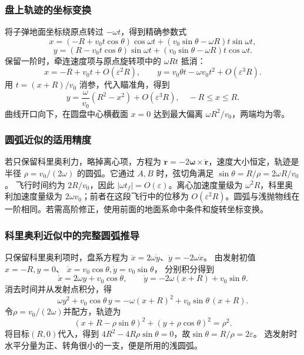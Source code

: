 \documentclass[UTF8,fontset=fandol,a4paper,11pt]{ctexart}
\newcommand{\vect}[1]{\bm{#1}}
\begin{document}
\subsubsection*{盘上轨迹的坐标变换}
将子弹地面坐标绕原点转过 $-\omega t$，得到精确参数式
\[
x=(-R+v_0t\cos\theta)\cos\omega t
+(v_0\sin\theta-\omega R)t\sin\omega t,
\]
\[
y=(R-v_0t\cos\theta)\sin\omega t
+(v_0\sin\theta-\omega R)t\cos\omega t.
\]
保留一阶时，牵连速度项与原点旋转项中的 $\omega Rt$ 抵消：
\[
x=-R+v_0t+O(\varepsilon^2R),\qquad
y=v_0\theta t-\omega v_0t^2+O(\varepsilon^3R).
\]
用 $t=(x+R)/v_0$ 消参，代入瞄准角，得到
\[
\boxed{y=\frac\omega{v_0}(R^2-x^2)+O(\varepsilon^3R),\quad -R\leq x\leq R}.
\]
曲线开口向下，在圆盘中心横截面 $x=0$ 达到最大偏离 $\omega R^2/v_0$，两端均为零。

\subsubsection*{圆弧近似的适用精度}
若只保留科里奥利力，略掉离心项，方程为 $\ddot{\vect r}=-2\vect\omega\times\dot{\vect r}$，速度大小恒定，轨迹是半径 $\rho=v_0/(2\omega)$ 的圆弧。它通过 $A,B$ 时，弦切角满足 $\sin\theta=R/\rho=2\omega R/v_0$。
飞行时间约为 $2R/v_0$，因此 $|\omega t_f|=O(\varepsilon)$。离心加速度量级为 $\omega^2 R$，科里奥利加速度量级为 $2\omega v_0$；前者在这段飞行中的位移为 $O(\varepsilon^2R)$。圆弧与浅抛物线在一阶相同。若需高阶修正，使用前面的地面系命中条件和旋转坐标变换。
\subsubsection*{科里奥利近似中的完整圆弧推导}
只保留科里奥利项时，盘系方程为
$\ddot x=2\omega\dot y$、$\ddot y=-2\omega\dot x$。
由发射初值$x=-R,y=0$、
$\dot x=v_0\cos\theta,\dot y=v_0\sin\theta$，
分别积分得到
\[
\dot x=2\omega y+v_0\cos\theta,\qquad
\dot y=-2\omega(x+R)+v_0\sin\theta.
\]
消去时间并从发射点积分，得
\[
\omega y^2+v_0\cos\theta\,y
=-\omega(x+R)^2+v_0\sin\theta\,(x+R).
\]
令$\rho=v_0/(2\omega)$并配方，轨迹为
\[
(x+R-\rho\sin\theta)^2+(y+\rho\cos\theta)^2=\rho^2.
\]
将目标$(R,0)$代入，得到
$4R^2-4R\rho\sin\theta=0$，故$\sin\theta=R/\rho=2\varepsilon$。
选发射时水平分量为正、转角很小的一支，便是所用的浅圆弧。
\end{document}
